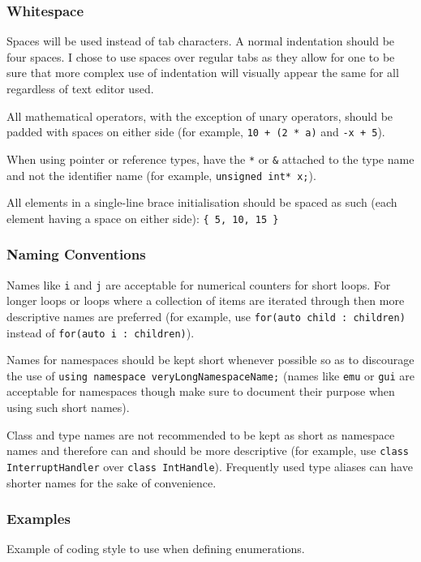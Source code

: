 	\subsubsection{Whitespace}
		Spaces will be used instead of tab characters. A normal indentation should be four spaces. I chose to use spaces over regular tabs as they allow for one to be sure that more complex use of indentation will visually appear the same for all regardless of text editor used.

		All mathematical operators, with the exception of unary operators, should be padded with spaces on either side (for example, \texttt{10 + (2 * a)} and \texttt{-x + 5}).

		When using pointer or reference types, have the \texttt{*} or \texttt{\&} attached to the type name and not the identifier name (for example, \texttt{unsigned int* x;}).

		All elements in a single-line brace initialisation should be spaced as such (each element having a space on either side): \texttt{\{ 5, 10, 15 \}}

	\subsubsection{Naming Conventions}
		Names like \texttt{i} and \texttt{j} are acceptable for numerical counters for short loops. For longer loops or loops where a collection of items are iterated through then more descriptive names are preferred (for example, use \texttt{for(auto child : children)} instead of \texttt{for(auto i : children)}).

		Names for namespaces should be kept short whenever possible so as to discourage the use of \texttt{using namespace veryLongNamespaceName;} (names like \texttt{emu} or \texttt{gui} are acceptable for namespaces though make sure to document their purpose when using such short names).

		Class and type names are not recommended to be kept as short as namespace names and therefore can and should be more descriptive (for example, use \texttt{class InterruptHandler} over \texttt{class IntHandle}). Frequently used type aliases can have shorter names for the sake of convenience.

	\subsubsection{Examples}
		\begin{listing}[h]
			
			\caption{Example of coding style to use when defining enumerations.}
			\label{lst:enum-example}
		\end{listing}

